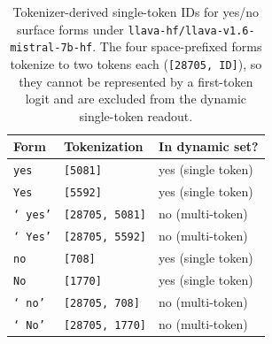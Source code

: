 \documentclass{article}
\begin{document}
\begin{table}[h]
\caption{Tokenizer-derived single-token IDs for yes/no surface forms
under \texttt{llava-hf/llava-v1.6-mistral-7b-hf}. The four
space-prefixed forms tokenize to two tokens each
(\texttt{[28705, ID]}), so they cannot be represented by a first-token
logit and are excluded from the dynamic single-token readout.}
\label{tab:crossmodel-tokens}
\centering
\begin{tabular}{lll}
\toprule
Form & Tokenization & In dynamic set? \\
\midrule
\texttt{yes}  & \texttt{[5081]} & yes (single token) \\
\texttt{Yes}  & \texttt{[5592]} & yes (single token) \\
\texttt{`\,yes'} & \texttt{[28705, 5081]} & no (multi-token) \\
\texttt{`\,Yes'} & \texttt{[28705, 5592]} & no (multi-token) \\
\midrule
\texttt{no}   & \texttt{[708]}  & yes (single token) \\
\texttt{No}   & \texttt{[1770]} & yes (single token) \\
\texttt{`\,no'}  & \texttt{[28705, 708]}  & no (multi-token) \\
\texttt{`\,No'}  & \texttt{[28705, 1770]} & no (multi-token) \\
\bottomrule
\end{tabular}
\end{table}
\end{document}
